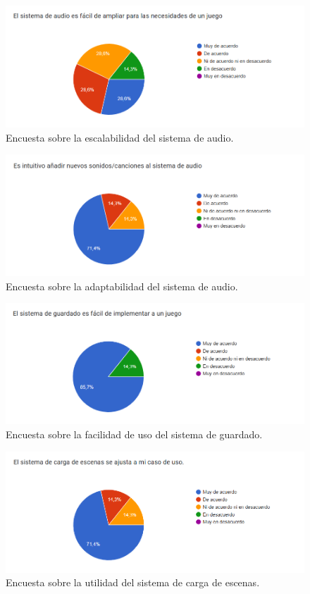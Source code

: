 \begin{figure}[H]
  \centering
  \includegraphics[width=450px,clip=true]{CUESTIONARIO_6.png}
  \caption{Encuesta sobre la escalabilidad del sistema de audio.}
  \label{fig:CUESTIONARIO_6}
\end{figure}
\raggedbottom

\begin{figure}[H]
  \centering
  \includegraphics[width=450px,clip=true]{CUESTIONARIO_7.png}
  \caption{Encuesta sobre la adaptabilidad del sistema de audio.}
  \label{fig:CUESTIONARIO_7}
\end{figure}
\raggedbottom

\begin{figure}[H]
  \centering
  \includegraphics[width=450px,clip=true]{CUESTIONARIO_8.png}
  \caption{Encuesta sobre la facilidad de uso del sistema de guardado.}
  \label{fig:CUESTIONARIO_8}
\end{figure}
\raggedbottom

\begin{figure}[H]
  \centering
  \includegraphics[width=450px,clip=true]{CUESTIONARIO_9.png}
  \caption{Encuesta sobre la utilidad del sistema de carga de escenas.}
  \label{fig:CUESTIONARIO_9}
\end{figure}
\raggedbottom

